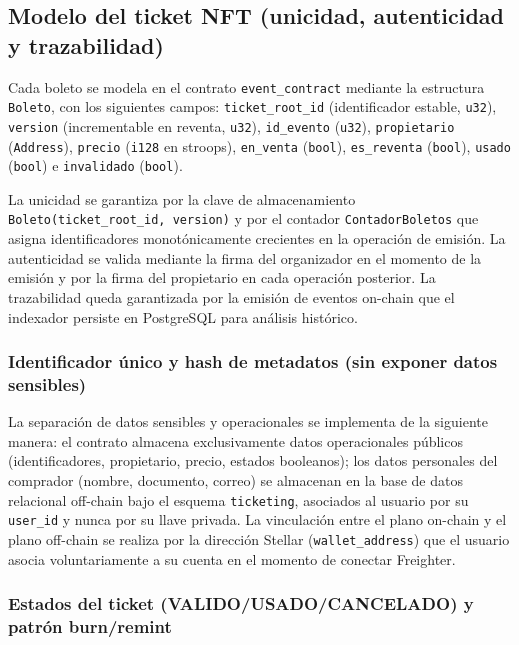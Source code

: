 \subsection{Modelo del ticket NFT (unicidad, autenticidad y trazabilidad)}

Cada boleto se modela en el contrato \texttt{event\_contract} mediante la estructura \texttt{Boleto}, con los siguientes campos: \texttt{ticket\_root\_id} (identificador estable, \texttt{u32}), \texttt{version} (incrementable en reventa, \texttt{u32}), \texttt{id\_evento} (\texttt{u32}), \texttt{propietario} (\texttt{Address}), \texttt{precio} (\texttt{i128} en stroops), \texttt{en\_venta} (\texttt{bool}), \texttt{es\_reventa} (\texttt{bool}), \texttt{usado} (\texttt{bool}) e \texttt{invalidado} (\texttt{bool}).

La unicidad se garantiza por la clave de almacenamiento \texttt{Boleto(ticket\_root\_id, version)} y por el contador \texttt{ContadorBoletos} que asigna identificadores monotónicamente crecientes en la operación de emisión. La autenticidad se valida mediante la firma del organizador en el momento de la emisión y por la firma del propietario en cada operación posterior. La trazabilidad queda garantizada por la emisión de eventos on-chain que el indexador persiste en PostgreSQL para análisis histórico.

\subsubsection{Identificador único y hash de metadatos (sin exponer datos sensibles)}

La separación de datos sensibles y operacionales se implementa de la siguiente manera: el contrato almacena exclusivamente datos operacionales públicos (identificadores, propietario, precio, estados booleanos); los datos personales del comprador (nombre, documento, correo) se almacenan en la base de datos relacional off-chain bajo el esquema \texttt{ticketing}, asociados al usuario por su \texttt{user\_id} y nunca por su llave privada. La vinculación entre el plano on-chain y el plano off-chain se realiza por la dirección Stellar (\texttt{wallet\_address}) que el usuario asocia voluntariamente a su cuenta en el momento de conectar Freighter.

\subsubsection{Estados del ticket (VALIDO/USADO/CANCELADO) y patrón burn/remint}

